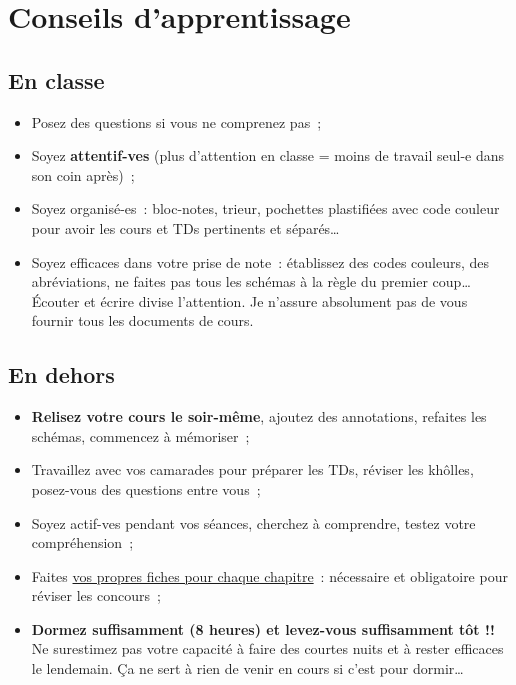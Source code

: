 \documentclass[10pt, garamond]{book}
\begin{document}
\section{Conseils d'apprentissage}

\subsection{En classe}
\begin{itemize}
	\item Posez des questions si vous ne comprenez pas~;
	\item Soyez \textbf{attentif-ves} (plus d'attention en classe = moins de
	      travail seul-e dans son coin après)~;
	\item Soyez organisé-es~: bloc-notes, trieur, pochettes plastifiées avec
	      code couleur pour avoir les cours et TDs pertinents et séparés…
	\item Soyez efficaces dans votre prise de note~: établissez des codes
	      couleurs, des abréviations, ne faites pas tous les schémas à la règle du
	      premier coup… Écouter et écrire divise l'attention. Je n'assure
	      absolument pas de vous fournir tous les documents de cours.
\end{itemize}

\subsection{En dehors}
\begin{itemize}
	\item \textbf{Relisez votre cours le soir-même}, ajoutez des annotations,
	      refaites les schémas, commencez à mémoriser~;
	\item Travaillez avec vos camarades pour préparer les TDs, réviser les
	      khôlles, posez-vous des questions entre vous~;
	\item Soyez actif-ves pendant vos séances, cherchez à comprendre, testez
	      votre compréhension~;
	\item Faites \underline{vos propres fiches pour chaque chapitre}~:
	      nécessaire et obligatoire pour réviser les concours~;
	\item \textbf{Dormez suffisamment (8 heures) et levez-vous suffisamment tôt
		      !!} Ne surestimez pas votre capacité à faire des courtes nuits et à
	      rester efficaces le lendemain. Ça ne sert à rien de venir en cours si
	      c'est pour dormir…
\end{itemize}
\end{document}
